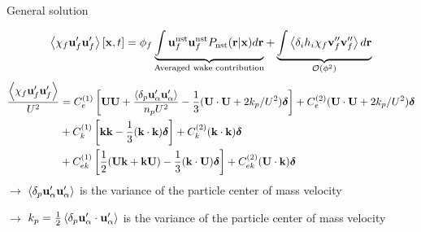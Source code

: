 \documentclass{sintefbeamer}
\begin{document}
\begin{frame}
  {General solution}
  
  \begin{equation*}
    \left<\chi_f \textbf{u}'_f\textbf{u}'_f\right>[\textbf{x},t]
    = \phi_f
    \underbrace{\int 
      \textbf{u}^\text{nst}_f
      \textbf{u}^\text{nst}_f 
      P_\text{nst}(\textbf{r}|\textbf{x}) d\textbf{r} 
    }_\text{Averaged wake contribution}
    + \underbrace{ 
      \int \left<\delta_i h_i \chi_f \textbf{v}_f''\textbf{v}_f''\right>  d\textbf{r}
    }_{\mathcal{O}(\phi^2)}
  \end{equation*}
  \begin{align}
    \frac{\left<\chi_f \textbf{u}_f'\textbf{u}_f'\right>}{U^2}
    &= 
    C^{(1)}_e \left[
        \textbf{U}\textbf{U}
        + \frac{\left<\delta_p \textbf{u}_\alpha'\textbf{u}_\alpha'\right>}{n_p U^2}
         - \frac{1}{3}(\textbf{U}\cdot \textbf{U}+2k_p/U^2)\bm\delta
    \right]
    + C^{(2)}_e 
    (\textbf{U}\cdot \textbf{U}+2k_p/U^2)\bm\delta \nonumber \\
    &+ C^{(1)}_k  \left[
        \textbf{kk}
         - \frac{1}{3}(\textbf{k}\cdot \textbf{k})\bm\delta
    \right]
    +C^{(2)}_k 
    (\textbf{k}\cdot \textbf{k})\bm\delta \nonumber \\
    &+ C^{(1)}_{ek} \left[
        \frac{1}{2}
        (\textbf{U}\textbf{k}  + \textbf{k} \textbf{U})
         - \frac{1}{3}(\textbf{k}\cdot \textbf{U})\bm\delta
    \right]
    + C^{(2)}_{ek}
    (\textbf{U}\cdot \textbf{k})\bm\delta 
\end{align}
$\to$ $\left<\delta_p \textbf{u}_\alpha'\textbf{u}_\alpha'\right>$ is the variance of the particle  center of mass velocity

$\to$ $k_p  = \frac{1}{2}\left<\delta_p \textbf{u}_\alpha'\cdot\textbf{u}_\alpha'\right>$ is the variance of the particle  center of mass velocity
\end{frame}
\end{document}
